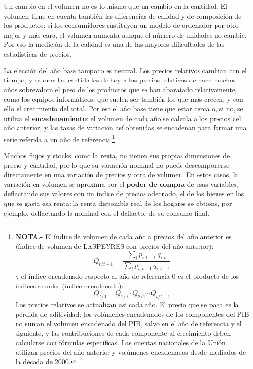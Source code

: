 \documentclass[10pt,a4paper]{article}
\begin{document}
Un cambio en el volumen no es lo mismo que un cambio en la cantidad. El volumen tiene en cuenta también las diferencias de calidad y de composición de los productos: si los consumidores sustituyen un modelo de ordenador por otro mejor y más caro, el volumen aumenta aunque el número de unidades no cambie. Por eso la medición de la calidad es una de las mayores dificultades de las estadísticas de precios.

La elección del año base tampoco es neutral. Los precios relativos cambian con el tiempo, y valorar las cantidades de hoy a los precios relativos de hace muchos años sobrevalora el peso de los productos que se han abaratado relativamente, como los equipos informáticos, que suelen ser también los que más crecen, y con ello el crecimiento del total. Por eso el año base tiene que estar cerca o, si no, se utiliza el \textbf{encadenamiento}: el volumen de cada año se calcula a los precios del año anterior, y las tasas de variación así obtenidas se encadenan para formar una serie referida a un año de referencia.\footnote{%
    \textbf{NOTA.-} El índice de volumen de cada año a precios del año anterior es (índice de volumen de LASPEYRES con precios del año anterior):
    $$Q_{t/t-1}=\frac{\sum_i p_{i,t-1}\,q_{i,t}}{\sum_i p_{i,t-1}\,q_{i,t-1}}$$
    y el índice encadenado respecto al año de referencia $0$ es el producto de los índices anuales (índice encadenado):
    $$Q_{t/0}=Q_{1/0}\cdot Q_{2/1}\cdots Q_{t/t-1}$$
    Los precios relativos se actualizan así cada año. El precio que se paga es la pérdida de aditividad: los volúmenes encadenados de los componentes del PIB no suman el volumen encadenado del PIB, salvo en el año de referencia y el siguiente, y las contribuciones de cada componente al crecimiento deben calcularse con fórmulas específicas. Las cuentas nacionales de la Unión utilizan precios del año anterior y volúmenes encadenados desde mediados de la década de 2000.
}

Muchos flujos y stocks, como la renta, no tienen sus propias dimensiones de precio y cantidad, por lo que su variación nominal no puede descomponerse directamente en una variación de precios y otra de volumen. En estos casos, la variación en volumen se aproxima por el \textbf{poder de compra} de esas variables, deflactando sus valores con un índice de precios adecuado, el de los bienes en los que se gasta esa renta: la renta disponible real de los hogares se obtiene, por ejemplo, deflactando la nominal con el deflactor de su consumo final.
\end{document}
